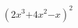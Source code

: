$
\begin{array}{l}
{}\\
{{\left({{2}{x}^{3}\mathrm{{+}}{4}{x}^{2}\mathrm{{-}}{x}}\right)}^{2}}
\end{array}
$
